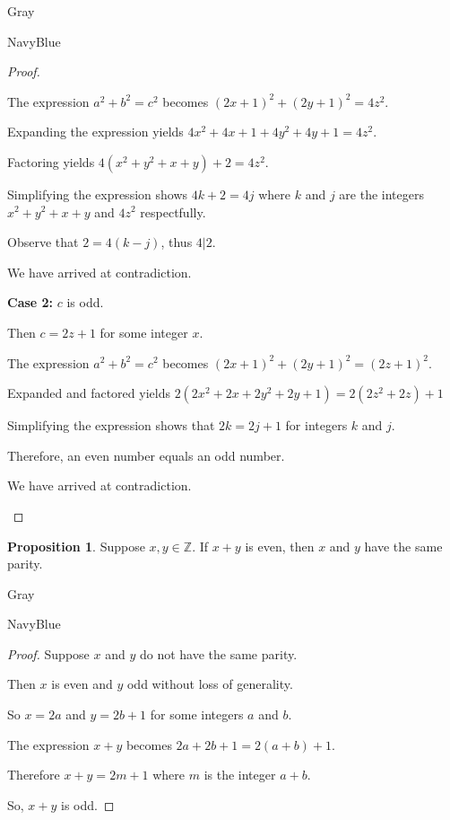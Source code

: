 \documentclass[12pt]{amsart}
\theoremstyle{named}
\newenvironment{prf}
{\medskip\begin{color}{Gray}\begin{framed}\begin{color}{NavyBlue}\begin{proof}[Proof]
\doublespacing}
{\end{proof}\end{color}\end{framed}\end{color}\medskip}
\theoremstyle{definition}
\newtheorem{proposition}{Proposition}
\newcommand{\Z}{\mathbb Z}
\begin{document}
\begin{prf}
\begin{adjustwidth}{2em}{0em}
		The expression $a^2 + b^2 = c^2$ becomes $(2x + 1)^2 + (2y+1)^2 = 4z^2$.

		Expanding the expression yields $4x^2 + 4x + 1 + 4y^2 + 4y + 1 = 4z^2$.

		Factoring yields $4(x^2+y^2+x+y)+2 = 4z^2$.

		Simplifying the expression shows $4k + 2 = 4j$ where $k$ and $j$ are
		the integers $x^2+y^2+x+y$ and $4z^2$ respectfully. 

		Observe that $2 = 4(k - j)$, thus $4|2$.
		
		We have arrived at contradiction.
	\end{adjustwidth}

	\textbf{Case 2:} $c$ is odd.
	\begin{adjustwidth}{2em}{0em}
		Then $c = 2z + 1$ for some integer $x$.

		The expression $a^2 + b^2 = c^2$ becomes $(2x + 1)^2 + (2y+1)^2 = (2z+1)^2$.

		Expanded and factored yields $2(2x^2 + 2x + 2y^2 + 2y + 1) = 2(2z^2 + 2z) + 1$

		Simplifying the expression shows that $2k = 2j + 1$ for integers $k$ and $j$.

		Therefore, an even number equals an odd number. 
		
		We have arrived at contradiction.
	\end{adjustwidth}
\end{prf}

\phantom{ }

\phantom{ }

\phantom{ }

\phantom{ }
\begin{proposition}
	Suppose $x,y\in\Z$.
	If $x+y$ is even, then $x$ and $y$ have the same parity.
\end{proposition}

\begin{prf}
	\phantom{ }


	Suppose $x$ and $y$ do not have the same parity.

	Then $x$ is even and $y$ odd without loss of generality.

	So $x = 2a$ and $y = 2b + 1$ for some integers $a$ and $b$.

	The expression $x + y$ becomes $2a + 2b + 1 = 2(a+b) + 1$.

	Therefore $x + y = 2m + 1$ where $m$ is the integer $a+b$.

	So, $x + y$ is odd.
\end{prf}
\end{document}
